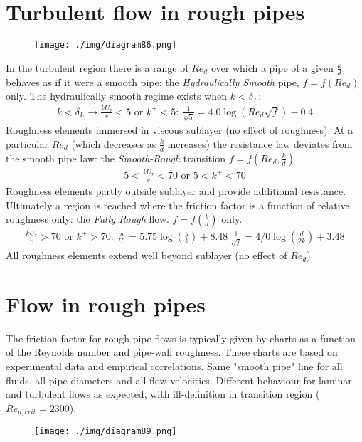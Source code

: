 \section{Turbulent flow in rough pipes}
\begin{figure}[H]
  \centering
  \texttt{[image: ./img/diagram86.png]}
  \caption{}
\end{figure}
In the turbulent region there is a range of $Re_d$ over which a pipe of a given $\frac{k}{d}$ behaves as if it were a smooth pipe: the \textit{Hydraulically Smooth} pipe, $f = f\left(Re_d\right)$ only. The hydraulically smooth regime exists when $k < \delta_L$:
\begin{align}
  k < \delta_L \rightarrow \frac{k U_{\tau}}{v} < 5 \textrm{ or } k^+ < 5: \ \frac{1}{\sqrt{5}} = 4.0 \log \left(Re_d \sqrt{f}\right) - 0.4
\end{align}
Roughness elements immersed in viscous sublayer (no effect of roughness). At a particular $Re_d$ (which decreases as $\frac{k}{d}$ increases) the resistance law deviates from the smooth pipe law: the \textit{Smooth-Rough} transition $f = f\left(Re_d, \frac{k}{d}\right)$
\begin{align}
  5 < \frac{k U_{\tau}}{v} < 70 \textrm{ or } 5 < k^+ < 70
\end{align}
Roughness elements partly outside sublayer and provide additional resistance. Ultimately a region is reached where the friction factor is a function of relative roughness only: the \textit{Fully Rough} flow. $f = f\left(\frac{k}{d}\right)$ only.
\begin{align}
  \frac{kU_{\tau}}{v} > 70\textrm{ or } k^+ > 70: \ \frac{u}{U_\tau} = 5.75 \log \left(\frac{y}{k}\right) + 8.48 \ \frac{1}{\sqrt{f}} = 4/0\log \left(\frac{d}{2k}\right) +3.48
\end{align}
All roughness elements extend well beyond sublayer (no effect of $Re_d$)
\section{Flow in rough pipes}
The friction factor for rough-pipe flows is typically given by charts as a function of  the Reynolds number and pipe-wall roughness. These charts are based on experimental data and empirical correlations. Same "smooth pipe" line for all fluids, all pipe diameters and all flow velocities. Different behaviour for laminar and turbulent flows as expected, with ill-definition in transition region ($Re_{d, crit} = 2300$).
\begin{figure}[H]
  \centering
  \texttt{[image: ./img/diagram89.png]}
  \caption{}
\end{figure}
